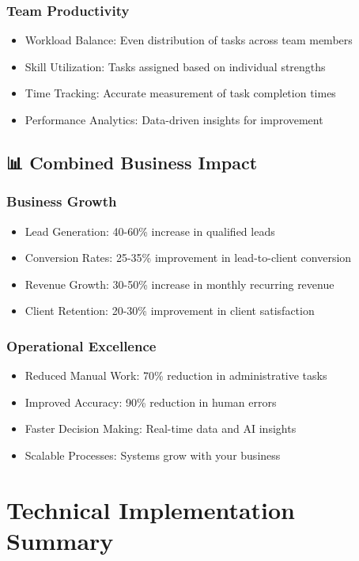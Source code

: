 \documentclass[12pt,a4paper]{article}
\begin{document}
\subsubsection{Team Productivity}
\begin{itemize}
    \item Workload Balance: Even distribution of tasks across team members
    \item Skill Utilization: Tasks assigned based on individual strengths
    \item Time Tracking: Accurate measurement of task completion times
    \item Performance Analytics: Data-driven insights for improvement
\end{itemize}

\subsection{📊 Combined Business Impact}

\subsubsection{Business Growth}
\begin{itemize}
    \item Lead Generation: 40-60\% increase in qualified leads
    \item Conversion Rates: 25-35\% improvement in lead-to-client conversion
    \item Revenue Growth: 30-50\% increase in monthly recurring revenue
    \item Client Retention: 20-30\% improvement in client satisfaction
\end{itemize}

\subsubsection{Operational Excellence}
\begin{itemize}
    \item Reduced Manual Work: 70\% reduction in administrative tasks
    \item Improved Accuracy: 90\% reduction in human errors
    \item Faster Decision Making: Real-time data and AI insights
    \item Scalable Processes: Systems grow with your business
\end{itemize}

\section{Technical Implementation Summary}
\end{document}
